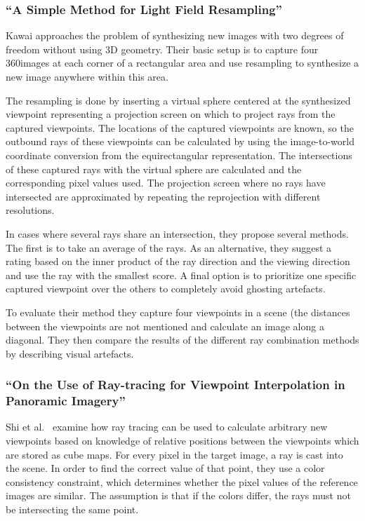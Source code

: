 
\subsubsection{``A Simple Method for Light Field Resampling'' \cite{simple_poster}}
Kawai \cite{simple_poster} approaches the problem of synthesizing new images with two degrees of freedom without using 3D geometry. Their basic setup is to capture four 360\degree images at each corner of a rectangular area and use resampling to synthesize a new image anywhere within this area.

The resampling is done by inserting a virtual sphere centered at the synthesized viewpoint representing a projection screen on which to project rays from the captured viewpoints. The locations of the captured viewpoints are known, so the outbound rays of these viewpoints can be calculated by using the image-to-world coordinate conversion from the equirectangular representation. The intersections of these captured rays with the virtual sphere are calculated and the corresponding pixel values used. The projection screen where no rays have intersected are approximated by repeating the reprojection with different resolutions.

In cases where several rays share an intersection, they propose several methods. The first is to take an average of the rays. As an alternative, they suggest a rating based on the inner product of the ray direction and the viewing direction and use the ray with the smallest score. A final option is to prioritize one specific captured viewpoint over the others to completely avoid ghosting artefacts.

To evaluate their method they capture four viewpoints in a scene (the distances between the viewpoints are not mentioned and calculate an image along a diagonal. They then compare the results of the different ray combination methods by describing visual artefacts.

\subsubsection{``On the Use of Ray-tracing for Viewpoint Interpolation in Panoramic Imagery'' \cite{raytracing}}
Shi et al.\ \cite{raytracing} examine how ray tracing can be used to calculate arbitrary new viewpoints based on knowledge of relative positions between the viewpoints which are stored as cube maps. For every pixel in the target image, a ray is cast into the scene. In order to find the correct value of that point, they use a color consistency constraint, which determines whether the pixel values of the reference images are similar. The assumption is that if the colors differ, the rays must not be intersecting the same point.

